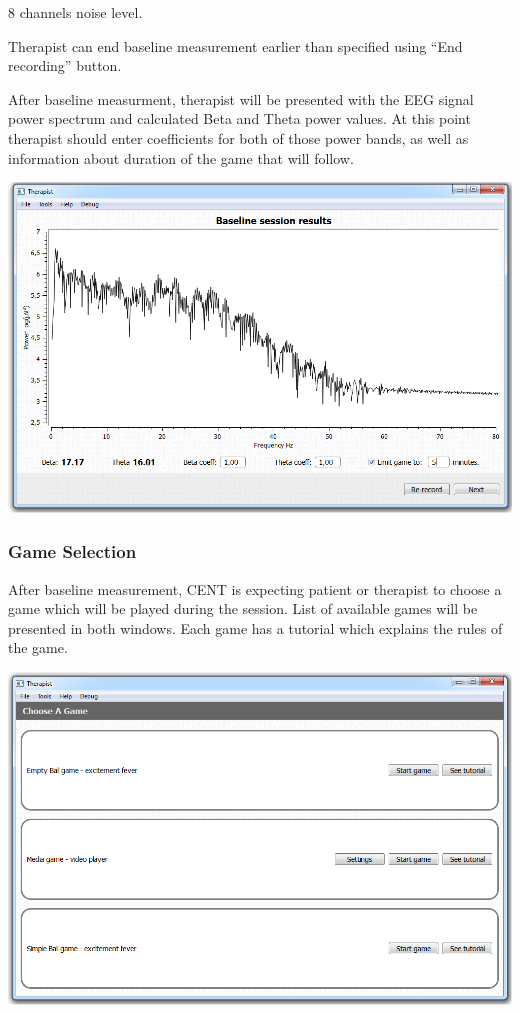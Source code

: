 \documentclass[letterpaper,10pt,english]{sphinxmanual}
\begin{document}
8 channels noise level.

Therapist can end baseline measurement earlier than specified using ``End recording'' button.

After baseline measurment, therapist will be presented with the EEG signal power spectrum and calculated Beta and Theta power values. At this point therapist should enter coefficients for both of those power bands, as well as information about duration of the game that will follow.

{\hfill\includegraphics{BaseLineResults.PNG}\hfill}


\subsubsection{Game Selection}
\label{index:game-selection}
After baseline measurement, CENT is expecting patient or therapist to choose a game which will be played during the session. List of available games will be presented in both windows. Each game has a tutorial which explains the rules of the game.

{\hfill\includegraphics{ChooseGame.PNG}\hfill}
\end{document}
